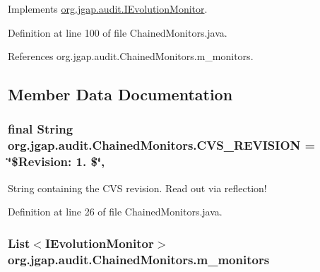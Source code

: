 Implements \hyperlink{interfaceorg_1_1jgap_1_1audit_1_1_i_evolution_monitor_a4352de2b8b067f78d8a4befcd6bf6593}{org.\-jgap.\-audit.\-I\-Evolution\-Monitor}.



Definition at line 100 of file Chained\-Monitors.\-java.



References org.\-jgap.\-audit.\-Chained\-Monitors.\-m\-\_\-monitors.



\subsection{Member Data Documentation}
\hypertarget{classorg_1_1jgap_1_1audit_1_1_chained_monitors_a45eeefd18ac7ad5499a7ef164e365131}{
\subsubsection[{C\-V\-S\-\_\-\-R\-E\-V\-I\-S\-I\-O\-N}]{\setlength{\rightskip}{0pt plus 5cm}final String org.\-jgap.\-audit.\-Chained\-Monitors.\-C\-V\-S\-\_\-\-R\-E\-V\-I\-S\-I\-O\-N = \char`\"{}\$Revision\-: 1. \$\char`\"{}\hspace{0.3cm}{\ttfamily [static]}, {\ttfamily [private]}}}\label{classorg_1_1jgap_1_1audit_1_1_chained_monitors_a45eeefd18ac7ad5499a7ef164e365131}
String containing the C\-V\-S revision. Read out via reflection! 

Definition at line 26 of file Chained\-Monitors.\-java.

\hypertarget{classorg_1_1jgap_1_1audit_1_1_chained_monitors_adccb968fc8473c44367a069975c646d9}{
\subsubsection[{m\-\_\-monitors}]{\setlength{\rightskip}{0pt plus 5cm}List$<${\bf I\-Evolution\-Monitor}$>$ org.\-jgap.\-audit.\-Chained\-Monitors.\-m\-\_\-monitors\hspace{0.3cm}{\ttfamily [private]}}}\label{classorg_1_1jgap_1_1audit_1_1_chained_monitors_adccb968fc8473c44367a069975c646d9}



